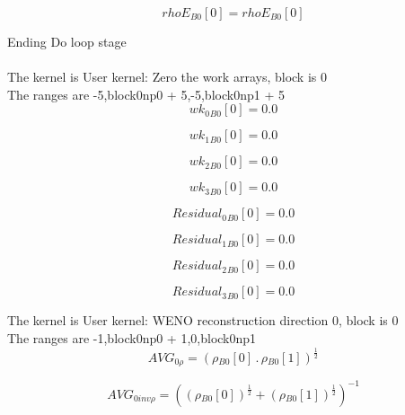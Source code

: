 \documentclass{article}
\begin{document}
\begin{dmath}{rhoE{_{B0}}}[{0}] = {rhoE{_{B0}}}[{0}]\end{dmath}

\noindent Ending Do loop stage\\
\\\noindent The kernel is User kernel: Zero the work arrays, block is 0\\\noindent The ranges are -5,block0np0 + 5,-5,block0np1 + 5\\\begin{dmath}{wk_{0}{_{B0}}}[{0}] = 0.0\end{dmath}

\begin{dmath}{wk_{1}{_{B0}}}[{0}] = 0.0\end{dmath}

\begin{dmath}{wk_{2}{_{B0}}}[{0}] = 0.0\end{dmath}

\begin{dmath}{wk_{3}{_{B0}}}[{0}] = 0.0\end{dmath}

\begin{dmath}{Residual_{0}{_{B0}}}[{0}] = 0.0\end{dmath}

\begin{dmath}{Residual_{1}{_{B0}}}[{0}] = 0.0\end{dmath}

\begin{dmath}{Residual_{2}{_{B0}}}[{0}] = 0.0\end{dmath}

\begin{dmath}{Residual_{3}{_{B0}}}[{0}] = 0.0\end{dmath}

\noindent The kernel is User kernel: WENO reconstruction direction 0, block is 0\\\noindent The ranges are -1,block0np0 + 1,0,block0np1\\\begin{dmath}AVG_{0 \rho} = \left({\rho{_{B0}}}[{0}] \,.\, {\rho{_{B0}}}[{1}] \right)^{\frac{1}{2}}\end{dmath}

\begin{dmath}AVG_{0 inv \rho} = \left(\left({\rho{_{B0}}}[{0}] \right)^{\frac{1}{2}} + \left({\rho{_{B0}}}[{1}] \right)^{\frac{1}{2}} \right)^{-1}\end{dmath}
\end{document}
